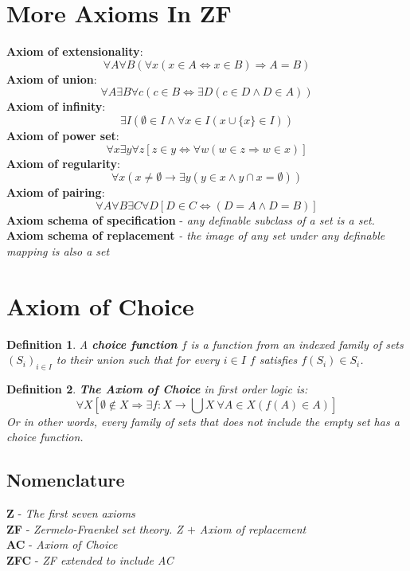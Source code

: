 \documentclass{article}
\theoremstyle{plain}
\newtheorem{definition}{Definition}[section]
\begin{document}
\newpage
\section{More Axioms In ZF}
\textbf{Axiom of extensionality}:
\[
	\forall A\forall B(\forall x(x\in A \iff x\in B)\Rightarrow A=B)
\]
\textbf{Axiom of union}:
\[
	\forall A \exists B \forall c(c\in B \iff \exists D(c\in D \land D\in A))
\]
\textbf{Axiom of infinity}:
\[
	\exists I(\emptyset \in I \land \forall x\in I (x\cup \{x\}\in I))
\]
\textbf{Axiom of power set}:
\[
	\forall x \exists y \forall z
	[z\in y \iff \forall w(w\in z \Rightarrow w\in x)]
\]
\textbf{Axiom of regularity}:
\[
	\forall 
	x(x\neq\emptyset \rightarrow \exists y(y\in x \land y\cap x = \emptyset))
\]
\textbf{Axiom of pairing}:
\[
	\forall A\forall B \exists C\forall D[D\in C \iff (D=A \land D=B)]
\]
\textbf{Axiom schema of specification} - \emph{any definable subclass of a set is a set.} \\
\textbf{Axiom schema of replacement} \emph{- the image of any set under any definable mapping is also a set}

\section{Axiom of Choice}
\begin{definition}
A \textbf{choice function} $f$ is a function from an indexed family of sets 
$(S_i)_{i\in I}$ to their union such that for every $i\in I$
$f$ satisfies $f(S_i) \in S_i$.
\end{definition}
\begin{definition}
\textbf{The Axiom of Choice} in first order logic is:
\[
	\forall X[\emptyset \notin X \Rightarrow \exists f:X\to\bigcup X \ 
	\forall A\in X(f(A)\in A)]
\]
Or in other words, every family of sets that does not include the empty set
has a choice function.
\end{definition}

\subsection{Nomenclature}
	\textbf{Z} - \emph{The first seven axioms} \\
	\textbf{ZF} - \emph{Zermelo-Fraenkel set theory. 
	Z $+$ Axiom of replacement}\\
    \textbf{AC} - \emph{Axiom of Choice} \\
    \textbf{ZFC} - \emph{ZF extended to include AC}
    
\newpage
\end{document}
